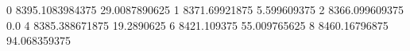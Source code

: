 0 8395.1083984375 29.0087890625
1 8371.69921875 5.599609375
2 8366.099609375 0.0
4 8385.388671875 19.2890625
6 8421.109375 55.009765625
8 8460.16796875 94.068359375
